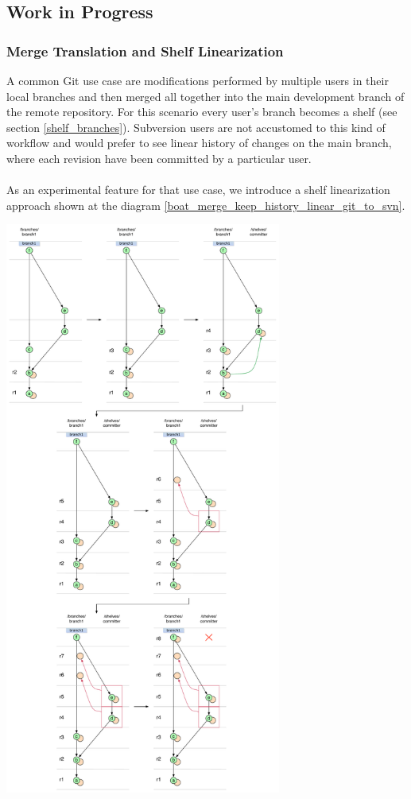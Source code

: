 \subsection{Work in Progress}

\subsubsection{Merge Translation and Shelf Linearization}

A common Git use case are modifications performed by multiple users in their local branches and then merged all together into the main development branch of the remote repository. 
For this scenario every user's branch becomes a shelf (see section \ref{shelf_branches}). Subversion users are not accustomed to
this kind of workflow and would prefer to see linear history of changes on the main branch, where each revision have been committed by a particular user.
\\\\
As an experimental feature for that use case, we introduce a shelf linearization approach shown at the diagram \ref{boat_merge_keep_history_linear_git_to_svn}.
\begin{center}
\includegraphics[height=18.9cm]{img/diagrams/boat_merge_keep_history_linear_git_to_svn.pdf}%
\label{boat_merge_keep_history_linear_git_to_svn}%
\end{center}

